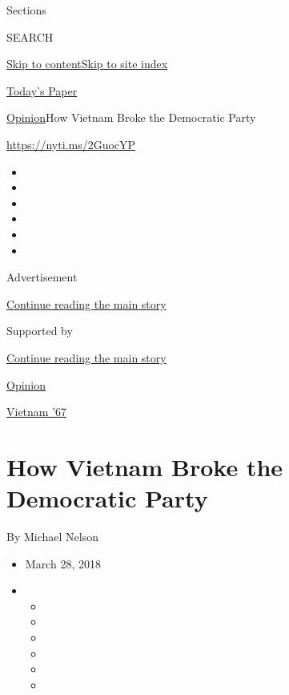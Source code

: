 Sections

SEARCH

\protect\hyperlink{site-content}{Skip to
content}\protect\hyperlink{site-index}{Skip to site index}

\href{https://myaccount.nytimes3xbfgragh.onion/auth/login?response_type=cookie\&client_id=vi}{}

\href{https://www.nytimes3xbfgragh.onion/section/todayspaper}{Today's
Paper}

\href{/section/opinion}{Opinion}\textbar{}How Vietnam Broke the
Democratic Party

\url{https://nyti.ms/2GuocYP}

\begin{itemize}
\item
\item
\item
\item
\item
\item
\end{itemize}

Advertisement

\protect\hyperlink{after-top}{Continue reading the main story}

Supported by

\protect\hyperlink{after-sponsor}{Continue reading the main story}

\href{/section/opinion}{Opinion}

\href{/column/vietnam-67}{Vietnam '67}

\hypertarget{how-vietnam-broke-the-democratic-party}{%
\section{How Vietnam Broke the Democratic
Party}\label{how-vietnam-broke-the-democratic-party}}

By Michael Nelson

\begin{itemize}
\item
  March 28, 2018
\item
  \begin{itemize}
  \item
  \item
  \item
  \item
  \item
  \item
  \end{itemize}
\end{itemize}

